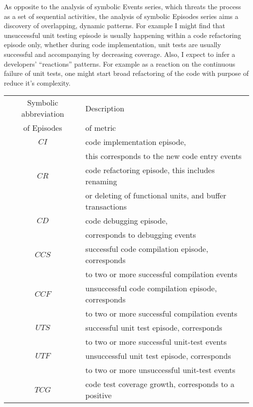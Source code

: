As opposite to the analysis of symbolic Events series, which threats the process as a set of sequential activities, the analysis of symbolic Episodes series aims a discovery of overlapping, dynamic patterns. For example I might find that unsuccessful unit testing episode is usually happening within a code refactoring episode only, whether during code implementation, unit tests are usually successful and accompanying by decreasing coverage. Also, I expect to infer a developers' ``reactions'' patterns. For example as a reaction on the continuous failure of unit tests, one might start broad refactoring of the code with purpose of reduce it's complexity. 
\begin{table}
\begin{center}
    \begin{tabular}{ | c | l | }
    \hline
    Symbolic abbreviation 	& Description \\ 
    of Episodes 						& of metric	  \\ 
    \hline
    $CI$ 									& code implementation episode, \\ 
    											& this corresponds to the new code entry events \\
	  \hline
    $CR$ 									& code refactoring episode, this includes renaming \\
    											& or deleting of functional units, and buffer transactions \\
    \hline
    $CD$ 									& code debugging episode, \\
    											& corresponds to debugging events \\
		\hline
		$CCS$ 								& successful code compilation episode, corresponds \\
													& to two or more successful compilation events \\
		\hline
		$CCF$ 								& unsuccessful code compilation episode, corresponds \\
													& to two or more successful compilation events \\
    \hline
		$UTS$ 								& successful unit test episode, corresponds \\
													& to two or more successful unit-test events \\
		\hline
		$UTF$ 							  & unsuccessful unit test episode, corresponds \\
													& to two or more unsuccessful unit-test events \\
		\hline
		$TCG$ 								& code test coverage growth, corresponds to a positive \\

\end{tabular}
\end{center}
\end{table}
